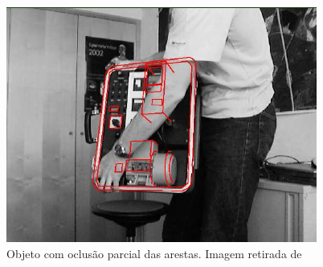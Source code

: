 \begin{figure}[ht!]
\centering
\includegraphics{monografia/occlusion.png}
\caption{Objeto com oclusão parcial das arestas. Imagem retirada de \cite{wuest}}
\label{occlusion}
\end{figure}

